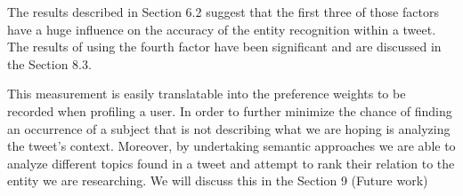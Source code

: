 The results described in Section 6.2 suggest that the first three of those factors have a huge influence on the accuracy of the entity recognition within a tweet. The results of using the fourth factor have been significant and are discussed in
the Section 8.3.

This measurement is easily translatable into the preference weights to be recorded when profiling a user.
In order to further minimize the chance of finding an occurrence of a subject that is not describing what we are hoping is analyzing the tweet's context.
Moreover, by undertaking semantic approaches we are able to analyze different topics found in a tweet and attempt to rank their relation to the entity we are researching. We will discuss this in the Section 9 (Future work)

